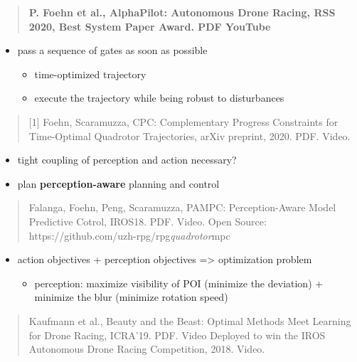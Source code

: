 \documentclass[]{article}
\begin{document}
\begin{quote}
\textbf{P. Foehn et al., AlphaPilot: Autonomous Drone Racing, RSS 2020,
Best System Paper Award. PDF YouTube}
\end{quote}

\begin{itemize}
\item
  pass a sequence of gates as soon as possible

  \begin{itemize}
  \item
    time-optimized trajectory
  \item
    execute the trajectory while being robust to disturbances
  \end{itemize}
\end{itemize}

\begin{quote}
{[}1{]} Foehn, Scaramuzza, CPC: Complementary Progress Constraints for
Time-Optimal Quadrotor Trajectories, arXiv preprint, 2020. PDF. Video.
\end{quote}

\begin{itemize}
\item
  tight coupling of perception and action necessary?
\item
  plan \textbf{perception-aware} planning and control
\end{itemize}

\begin{quote}
Falanga, Foehn, Peng, Scaramuzza, PAMPC: Perception-Aware Model
Predictive Cotrol, IROS18. PDF. Video. Open Source:
https://github.com/uzh-rpg/rpg\emph{quadrotor}mpc
\end{quote}

\begin{itemize}
\item
  action objectives + perception objectives =\textgreater{} optimization
  problem

  \begin{itemize}
  \item
    perception: maximize visibility of POI (minimize the deviation) +
    minimize the blur (minimize rotation speed)
  \end{itemize}
\end{itemize}

\begin{quote}
Kaufmann et al., Beauty and the Beast: Optimal Methods Meet Learning for
Drone Racing, ICRA'19. PDF. Video Deployed to win the IROS Autonomous
Drone Racing Competition, 2018. Video.
\end{quote}
\end{document}
